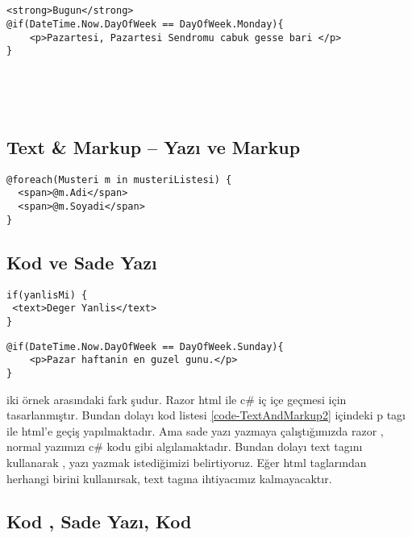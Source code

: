 \documentclass[10pt,a4paper]{article}
\begin{document}
\begin{lstlisting}[label=code-ConditionalVariableExample1,caption=Durum Kontrol Örnek - if]


<strong>Bugun</strong>
@if(DateTime.Now.DayOfWeek == DayOfWeek.Monday){
    <p>Pazartesi, Pazartesi Sendromu cabuk gesse bari </p>
}





\end{lstlisting}



\subsection{Text \& Markup -- Yazı ve Markup}

\begin{lstlisting}[label=code-TextAndMarkup,caption=Yazı ve Markup]
@foreach(Musteri m in musteriListesi) {
  <span>@m.Adi</span> 
  <span>@m.Soyadi</span> 
}
\end{lstlisting}


\subsection{Kod ve Sade Yazı}


\begin{lstlisting}[label=code-TextAndMarkup1,caption=Yazı ve Markup 1]
if(yanlisMi) {
 <text>Deger Yanlis</text>
}
\end{lstlisting}

\begin{lstlisting}[label=code-TextAndMarkup2,caption=Yazı ve Markup 2]
@if(DateTime.Now.DayOfWeek == DayOfWeek.Sunday){
    <p>Pazar haftanin en guzel gunu.</p>
}\end{lstlisting}


iki örnek arasındaki fark şudur. 
Razor html ile c\# iç içe geçmesi için tasarlanmıştır.
Bundan dolayı kod listesi \ref{code-TextAndMarkup2} içindeki p tagı ile html'e geçiş yapılmaktadır.
Ama sade yazı yazmaya çalıştığımızda razor , normal yazımızı c\# kodu gibi algılamaktadır.
Bundan dolayı text tagını kullanarak , yazı yazmak istediğimizi belirtiyoruz.
Eğer html taglarından herhangi birini kullanırsak, text tagına ihtiyacımız kalmayacaktır.





\subsection{Kod , Sade Yazı, Kod}
\end{document}
